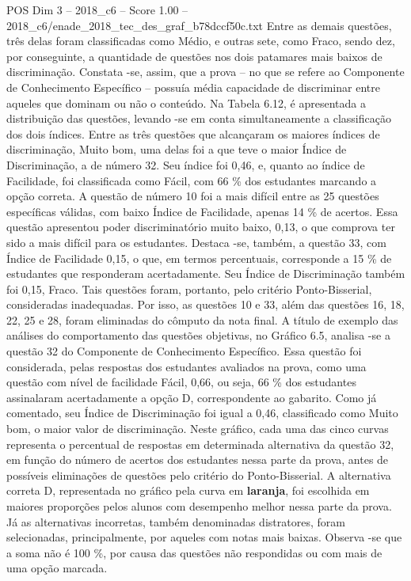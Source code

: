 \begin{textsample}{POS Dim 3 – 2018\_c6 – Score 1.00 – 2018\_c6/enade\_2018\_tec\_des\_graf\_b78dccf50c.txt}
Entre as demais questões, três delas foram classificadas como Médio, e outras sete, como Fraco, sendo dez, por conseguinte, a quantidade de questões nos dois patamares mais baixos de discriminação.
Constata -se, assim, que a prova – no que se refere ao Componente de Conhecimento Específico – possuía média capacidade de discriminar entre aqueles que dominam ou não o conteúdo.
Na Tabela 6.12, é apresentada a distribuição das questões, levando -se em conta simultaneamente a classificação dos dois índices.
Entre as três questões que alcançaram os maiores índices de discriminação, Muito bom, uma delas foi a que teve o maior Índice de Discriminação, a de número 32.
Seu índice foi 0,46, e, quanto ao índice de Facilidade, foi classificada como Fácil, com 66 \% dos estudantes marcando a opção correta.
A questão de número 10 foi a mais difícil entre as 25 questões específicas válidas, com baixo Índice de Facilidade, apenas 14 \% de acertos.
Essa questão apresentou poder discriminatório muito baixo, 0,13, o que comprova ter sido a mais difícil para os estudantes.
Destaca -se, também, a questão 33, com Índice de Facilidade 0,15, o que, em termos percentuais, corresponde a 15 \% de estudantes que responderam acertadamente.
Seu Índice de Discriminação também foi 0,15, Fraco.
Tais questões foram, portanto, pelo critério Ponto-Bisserial, consideradas inadequadas.
Por isso, as questões 10 e 33, além das questões 16, 18, 22, 25 e 28, foram eliminadas do cômputo da nota final.
A título de exemplo das análises do comportamento das questões objetivas, no Gráfico 6.5, analisa -se a questão 32 do Componente de Conhecimento Específico.
Essa questão foi considerada, pelas respostas dos estudantes avaliados na prova, como uma questão com nível de facilidade Fácil, 0,66, ou seja, 66 \% dos estudantes assinalaram acertadamente a opção D, correspondente ao gabarito.
Como já comentado, seu Índice de Discriminação foi igual a 0,46, classificado como Muito bom, o maior valor de discriminação.
Neste gráfico, cada uma das cinco curvas representa o percentual de respostas em determinada alternativa da questão 32, em função do número de acertos dos estudantes nessa parte da prova, antes de possíveis eliminações de questões pelo critério do Ponto-Bisserial.
A alternativa correta D, representada no gráfico pela curva em \textbf{laranja}, foi escolhida em maiores proporções pelos alunos com desempenho melhor nessa parte da prova.
Já as alternativas incorretas, também denominadas distratores, foram selecionadas, principalmente, por aqueles com notas mais baixas.
Observa -se que a soma não é 100 \%, por causa das questões não respondidas ou com mais de uma opção marcada.

\end{textsample}
